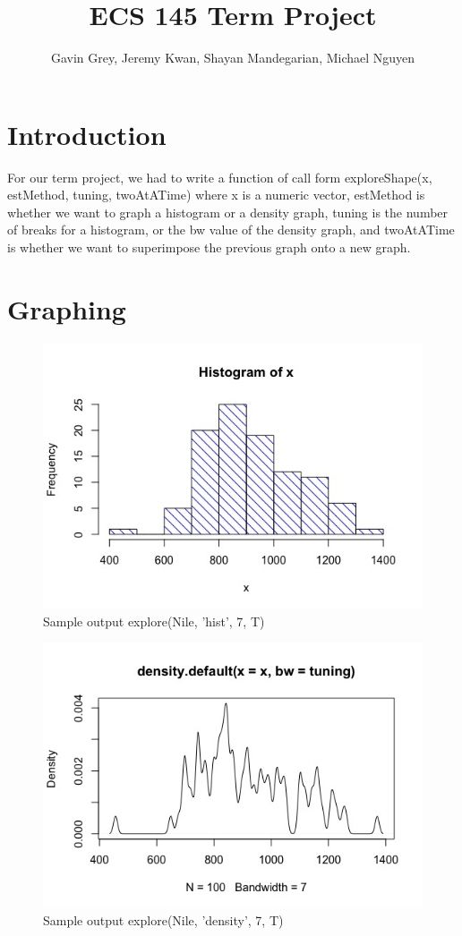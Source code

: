 \documentclass{article}
\title{ECS 145 Term Project}
\author{Gavin Grey, Jeremy Kwan, Shayan Mandegarian, Michael Nguyen}
\date{}
\begin{document}
\maketitle

\section{Introduction}
For our term project, we had to write a function of call form exploreShape(x, estMethod, tuning, twoAtATime) where x is a numeric vector, estMethod is whether we want to graph a histogram or a density graph, tuning is the number of breaks for a histogram, or the bw value of the density graph, and twoAtATime is whether we want to superimpose the previous graph onto a new graph.


\section{Graphing}

\begin{figure}[H]
\centering
\includegraphics[scale=0.5]{Nile, 7 histogram.jpeg}
\caption{Sample output explore(Nile, 'hist', 7, T)}
\label{fig:Nile histogram 7}
\end{figure}


\begin{figure}[H]
\centering
\includegraphics[scale=0.5]{Nile, 7 Tuning param.jpeg}
\caption{Sample output explore(Nile, 'density', 7, T)}
\label{fig:Nile density graph 7}
\end{figure}
\end{document}
